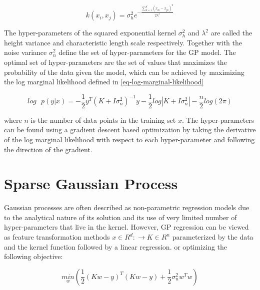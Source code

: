 \documentclass[a4paper,12pt]{article}
\begin{document}
\begin{equation}
\label{eq-squared-exponential}
k(x_{i},x_{j}) = \sigma_{h}^{2}e^{-\frac{\sum_{k=1}^{d}(x_{ik}-x_{jk})^{2}}{2\lambda^{2}}}
\end{equation}

The hyper-parameters of the squared exponential kernel $\sigma_{h}^{2}$ and $\lambda^{2}$ are called the height variance and characteristic length scale respectively. Together with the noise variance $\sigma_{n}^{2}$ define the set of hyper-parameters for the GP model. The optimal set of hyper-parameters are the set of values that maximizes the probability of the data given the model, which can be achieved by maximizing the log marginal likelihood defined in \eqref{eq-log-marginal-likelihood} 

\begin{equation}
\label{eq-log-marginal-likelihood}
log\text{ }p(y|x) = -\frac{1}{2}y^{T}\left(K+I\sigma_{n}^{2} \right)^{-1}y-\frac{1}{2}log\left | K+I\sigma_{n}^{2}\right|-\frac{n}{2}log(2\pi)
\end{equation}

where $n$ is the number of data points in the training set $x$. The hyper-parameters can be found using a gradient descent based optimization by taking the derivative of the log marginal likelihood with respect to each hyper-parameter and following the direction of the gradient.

\section{Sparse Gaussian Process}
\label{sec-sparse-gaussian-process}
Gaussian processes are often described as non-parametric regression models due to the analytical nature of its solution and its use of very limited number of hyper-parameters that live in the kernel. However, GP regression can be viewed as feature transformation methods $x\in R^{d}:\rightarrow K\in R^{n}$ parameterized by the data and the kernel function followed by a linear regression. or optimizing the following objective:

\begin{equation}
\label{eq-linear-regression-objective}
\underset{w}{min}\left (\frac{1}{2}\left ( Kw-y \right )^{T} \left( Kw-y \right )+\frac{1}{2}\sigma_{n}^{2}w^{T}w\right )
\end{equation}
\end{document}
